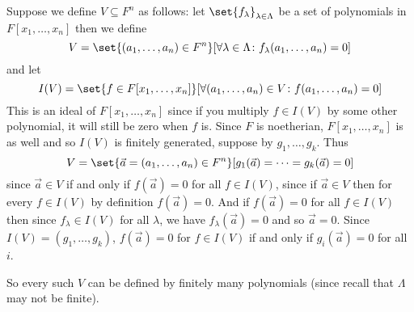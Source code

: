 \documentclass[10pt]{article}
\begin{document}
Suppose we define $V\subseteq F^n$ as follows: let $\set{f_\lambda}_{\lambda\in\Lambda}$ be a set of polynomials in $F[x_1,\dots,x_n]$ then we define
\[ V = \set{(a_1,\dots,a_n)\in F^n}[\forall\lambda\in\Lambda\colon f_\lambda(a_1,\dots,a_n)=0] \]
and let
\[ I(V) = \set{f\in F[x_1,\dots,x_n]}[\forall(a_1,\dots,a_n)\in V\colon f(a_1,\dots,a_n)=0] \]
This is an ideal of $F[x_1,\dots,x_n]$ since if you multiply $f\in I(V)$ by some other polynomial, it will still be zero when $f$ is.
Since $F$ is noetherian, $F[x_1,\dots,x_n]$ is as well and so $I(V)$ is finitely generated, suppose by $g_1,\dots,g_k$.
Thus
\[ V = \set{\vec a=(a_1,\dots,a_n)\in F^n}[g_1(\vec a)=\cdots=g_k(\vec a)=0] \]
since $\vec a\in V$ if and only if $f(\vec a)=0$ for all $f\in I(V)$, since if $\vec a\in V$ then for every $f\in I(V)$ by definition $f(\vec a)=0$.
And if $f(\vec a)=0$ for all $f\in I(V)$ then since $f_\lambda\in I(V)$ for all $\lambda$, we have $f_\lambda(\vec a)=0$ and so $\vec a=0$.
Since $I(V)=(g_1,\dots,g_k)$, $f(\vec a)=0$ for $f\in I(V)$ if and only if $g_i(\vec a)=0$ for all $i$.

So every such $V$ can be defined by finitely many polynomials (since recall that $\Lambda$ may not be finite).
\end{document}
